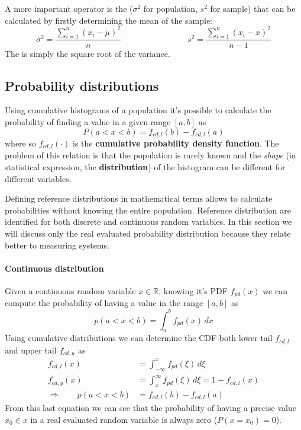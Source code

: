 	A more important operator is the  ($\sigma^2$ for population, $s^2$ for sample) that can be calculated by firstly determining the mean of the sample:
	\begin{equation}
		\sigma^2 = \frac{\sum_{i=1}^n (x_i-\mu)^2 }{n} \qquad \qquad \qquad \qquad s^2 = \frac{\sum_{i=1}^n (x_i-\overline x)^2 }{n-1}
	\end{equation}
	The  is simply the square root of the variance.
	
\subsection{Probability distributions}
	Using cumulative histograms of a population it's possible to calculate the probability of finding a value in a given range $[a,b]$ as
	\[ P(a<x<b) = f_{cd,l}(b)-f_{cd,l}(a) \]
	where so $f_{cd,l}(\cdot)$ is the \textbf{cumulative probability density function}. The problem of this relation is that the population is rarely known and the \textit{shape} (in statistical expression, the \textbf{distribution}) of the histogram can be different for different variables.
	
	Defining reference distributions in mathematical terms allows to calculate probabilities without knowing the entire population. Reference distribution are identified for both discrete and continuous random variables. In this section we will discuss only the real evaluated probability distribution because they relate better to measuring systems.
	
	\paragraph{Continuous distribution} Given a continuous random variable $x\in\mathds R$, knowing it's  PDF $f_{pd}(x)$ we can compute the probability of having a value in the range $[a,b]$ as
	\begin{equation}
		p(a<x<b) = \int_a^b f_{pd}(x)\, dx
	\end{equation}
	Using cumulative distributions we can determine the  CDF both lower tail $f_{cd,l}$ and upper tail $f_{cd,u}$ as
	\begin{equation}
	\begin{aligned}
		f_{cd,l}(x) & = \int_{-\infty}^x f_{pd}(\xi)\, d\xi \\
		f_{cd,y}(x) & = \int_x^\infty f_{pd}(\xi)\, d\xi = 1 - f_{cd,l}(x) \\
		\Rightarrow \qquad p(a<x<b) &= f_{cd,l}(b)-f_{cd,l}(a)
	\end{aligned}
	\end{equation}
	From this last equation we can see that the probability of having a precise value $x_0\in x$ in a real  evaluated random variable is always zero ($P(x=x_0) = 0$).
	
